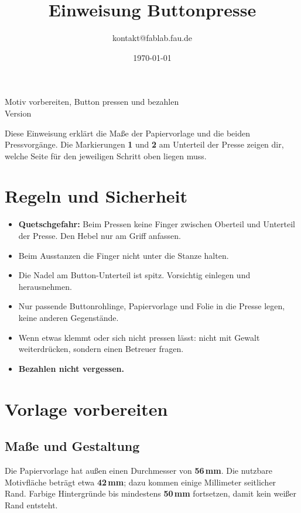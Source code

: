 \documentclass{\basedir/fablab-document}
\date{\today}
\author{kontakt@fablab.fau.de}
\title{Einweisung Buttonpresse}
\begin{document}
\maketitle
\begin{center}
Motiv vorbereiten, Button pressen und bezahlen\\[1mm]
{\small Version \Version}
\end{center}

Diese Einweisung erklärt die Maße der Papiervorlage und die beiden Pressvorgänge.
Die Markierungen \textbf{1} und \textbf{2} am Unterteil der Presse zeigen dir,
welche Seite für den jeweiligen Schritt oben liegen muss.

\section{Regeln und Sicherheit}
\begin{itemize}
 \item \textbf{Quetschgefahr:} Beim Pressen keine Finger zwischen Oberteil und Unterteil der Presse. Den Hebel nur am Griff anfassen.
 \item Beim Ausstanzen die Finger nicht unter die Stanze halten.
 \item Die Nadel am Button-Unterteil ist spitz. Vorsichtig einlegen und herausnehmen.
 \item Nur passende Buttonrohlinge, Papiervorlage und Folie in die Presse legen, keine anderen Gegenstände.
 \item Wenn etwas klemmt oder sich nicht pressen lässt: nicht mit Gewalt weiterdrücken, sondern einen Betreuer fragen.
 \item \textbf{Bezahlen nicht vergessen.}
\end{itemize}

\newpage
\renewcommand{\contentsname}{Inhaltsverzeichnis / Arbeitsablauf}
\setcounter{tocdepth}{2}
\tableofcontents
\clearpage

\section{Vorlage vorbereiten}
\subsection{Maße und Gestaltung}
Die Papiervorlage hat außen einen Durchmesser von \textbf{56\,mm}.
Die nutzbare Motivfläche beträgt etwa \textbf{42\,mm}; dazu kommen einige Millimeter seitlicher Rand.
Farbige Hintergründe bis mindestens \textbf{50\,mm} fortsetzen, damit kein weißer Rand entsteht.
\end{document}
